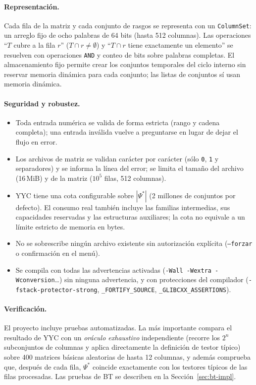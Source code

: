 \documentclass[11pt, a4paper]{article}
\theoremstyle{definition}
\theoremstyle{plain}
\newcommand{\Psis}{\Psi^{*}}
\begin{document}
\paragraph{Representación.} Cada fila de la matriz y cada conjunto de rasgos se
representa con un \texttt{ColumnSet}: un arreglo fijo de ocho palabras de 64 bits
(hasta 512 columnas). Las operaciones ``$T$ cubre a la fila $r$'' ($T\cap r\neq\emptyset$)
y ``$T\cap r$ tiene exactamente un elemento'' se resuelven con operaciones
\texttt{AND} y conteo de bits sobre palabras completas. El almacenamiento fijo
permite crear los conjuntos temporales del ciclo interno sin reservar memoria
dinámica para cada conjunto; las listas de conjuntos sí usan memoria dinámica.

\paragraph{Seguridad y robustez.}
\begin{itemize}[nosep]
\item Toda entrada numérica se valida de forma estricta (rango y cadena completa);
  una entrada inválida vuelve a preguntarse en lugar de dejar el flujo en error.
\item Los archivos de matriz se validan carácter por carácter (sólo \texttt{0}, \texttt{1}
  y separadores) y se informa la línea del error; se limita el tamaño del archivo
  (16\,MiB) y de la matriz ($10^5$ filas, 512 columnas).
\item YYC tiene una cota configurable sobre $|\Psis|$ (2 millones de conjuntos
  por defecto). El consumo real también incluye las familias intermedias, sus
  capacidades reservadas y las estructuras auxiliares; la cota no equivale a un
  límite estricto de memoria en bytes.
\item No se sobrescribe ningún archivo existente sin autorización explícita
  (\texttt{--forzar} o confirmación en el menú).
\item Se compila con todas las advertencias activadas (\texttt{-Wall -Wextra
  -Wconversion}\ldots) sin ninguna advertencia, y con protecciones del compilador
  (\texttt{-fstack-protector-strong}, \texttt{\_FORTIFY\_SOURCE},
  \texttt{\_GLIBCXX\_ASSERTIONS}).
\end{itemize}

\paragraph{Verificación.} El proyecto incluye \NumeroPruebas{} pruebas automatizadas. La más
importante compara el resultado de YYC con un \emph{oráculo exhaustivo}
independiente (recorre los $2^n$ subconjuntos de columnas y aplica directamente
la definición de testor típico) sobre 400 matrices básicas aleatorias de hasta
12 columnas, y además comprueba que, después de cada fila, $\Psis$ coincide
exactamente con los testores típicos de las filas procesadas. Las pruebas de
BT se describen en la Sección~\ref{sec:bt-impl}.
\end{document}
